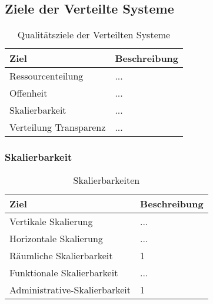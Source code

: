 \clearpage
\subsection{Ziele der Verteilte Systeme}
    \begin{table}[h!]
        \centering
        \begin{tabular}{p{4cm}|p{10cm}}
            \hline
            \textbf{Ziel} & \textbf{Beschreibung} \\
            \hline
            Ressourcenteilung  & ...\\
            Offenheit & ...\\
            Skalierbarkeit & ...\\
            Verteilung Transparenz & ...\\
            \hline
        \end{tabular}
        \caption{Qualitätsziele der Verteilten Systeme}
        \label{tab:qualitaetsziele}
    \end{table}
    
\subsubsection{Skalierbarkeit}
    \begin{table}[h!]
            \centering
            \begin{tabular}{p{4cm}|p{10cm}}
                \hline
                \textbf{Ziel} & \textbf{Beschreibung} \\
                \hline
                Vertikale Skalierung   & ...\\
                Horizontale Skalierung & ...\\
                Räumliche Skalierbarkeit &  1\\
                Funktionale Skalierbarkeit & ...\\
                Administrative-Skalierbarkeit & 1 \\
                \hline
            \end{tabular}
            \caption{Skalierbarkeiten}
            \label{tab:qualitaetsziele}
        \end{table}
    
\newpage
